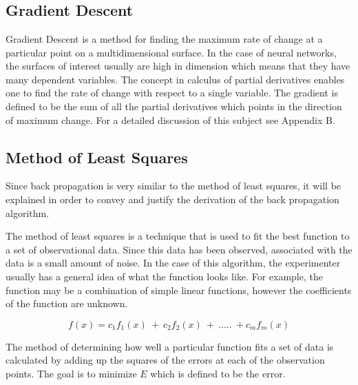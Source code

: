 \parskip 0.20in
\textheight 8.75in
\textwidth 6.0in
\topmargin -0.25in
\oddsidemargin 0.40in
\appendix

\baselineskip 0.30in

\setcounter{page}{50}

\chapter{}
\section{Gradient Descent}

	Gradient Descent is a method for finding the maximum rate of
change at a particular point on a multidimensional surface.  In the
case of neural networks, the surfaces of interest usually are high in
dimension which means that they have many dependent variables.  The
concept in calculus of partial derivatives enables one to find the
rate of change with respect to a single variable.  The gradient is
defined to be the sum of all the partial derivatives which points in
the direction of maximum change.  For a detailed discussion of this
subject see Appendix B.

\section{Method of Least Squares}
		
	Since back propagation is very similar to the method of
least squares, it will be explained in order to convey and justify the
derivation of the back propagation algorithm.  

	The method of least squares is a technique that is used to fit
the best function to a set of observational data.  Since this data has
been observed, associated with the data is a small amount of noise.
In the case of this algorithm, the experimenter usually has a general
idea of what the function looks like.  For example, the function may
be a combination of simple linear functions, however the coefficients
of the function are unknown.

	$$f(x) = c_1 f_1(x)\ + \ c_2 f_2(x)\ + \ ..... \  + c_m f_m(x)$$

	The method of determining how well a particular function fits
a set of data is calculated by adding up the squares of the errors at
each of the observation points.  The goal is to minimize $E$ which is
defined to be the error.  


